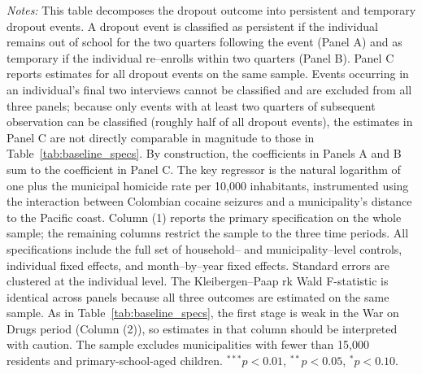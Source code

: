 \documentclass[12pt,letter,english,intoc,bibliography=totoc,index=totoc,BCOR10mm,captions=tableheading,nottitlepage,fleqn]{article}
\theoremstyle{break}
\begin{document}
\begin{table}[H]
\caption{Dropout Decomposition: Persistent and Temporary Dropouts}
\label{tab:perm_decomposition}
\centering
\scriptsize

\vspace{2mm}
\begin{minipage}{0.95\linewidth}
\scriptsize \singlespacing
\textit{Notes:} This table decomposes the dropout outcome into persistent and temporary dropout events. A dropout event is classified as persistent if the individual remains out of school for the two quarters following the event (Panel A) and as temporary if the individual re--enrolls within two quarters (Panel B). Panel C reports estimates for all dropout events on the same sample. Events occurring in an individual's final two interviews cannot be classified and are excluded from all three panels; because only events with at least two quarters of subsequent observation can be classified (roughly half of all dropout events), the estimates in Panel C are not directly comparable in magnitude to those in Table~\ref{tab:baseline_specs}. By construction, the coefficients in Panels A and B sum to the coefficient in Panel C. The key regressor is the natural logarithm of one plus the municipal homicide rate per 10{,}000 inhabitants, instrumented using the interaction between Colombian cocaine seizures and a municipality's distance to the Pacific coast. Column (1) reports the primary specification on the whole sample; the remaining columns restrict the sample to the three time periods. All specifications include the full set of household-- and municipality--level controls, individual fixed effects, and month--by--year fixed effects. Standard errors are clustered at the individual level. The Kleibergen--Paap rk Wald F-statistic is identical across panels because all three outcomes are estimated on the same sample. As in Table~\ref{tab:baseline_specs}, the first stage is weak in the War on Drugs period (Column (2)), so estimates in that column should be interpreted with caution. The sample excludes municipalities with fewer than 15{,}000 residents and primary-school-aged children. $^{***}p<0.01$, $^{**}p<0.05$, $^{*}p<0.10$.
\end{minipage}
\end{table}
\end{document}
